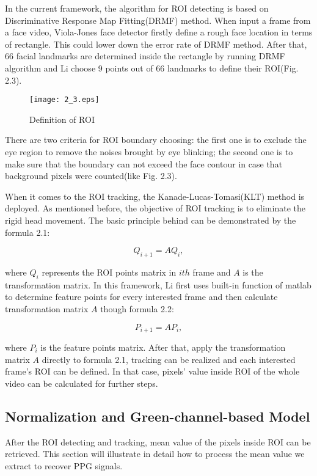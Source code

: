 In the current framework, the algorithm for ROI detecting is based on Discriminative Response Map Fitting(DRMF) method. When input a frame from a face video, Viola-Jones face detector firstly define a rough face location in terms of rectangle. This could lower down the error rate of DRMF method. After that, 66 facial landmarks are determined inside the rectangle by running DRMF algorithm and Li choose 9 points out of 66 landmarks to define their ROI(Fig. 2.3). 

\begin{figure}[ht]
\centering
\texttt{[image: 2\_3.eps]}
\caption{Definition of ROI}\label{fig:noted-figure}
\end{figure}

There are two criteria for ROI boundary choosing: the first one is to exclude the eye region to remove the noises brought by eye blinking; the second one is to make sure that the boundary can not exceed the face contour in case that background pixels were counted(like Fig. 2.3).

When it comes to the ROI tracking, the Kanade-Lucas-Tomasi(KLT) method is deployed. As mentioned before, the objective of ROI tracking is to eliminate the rigid head movement. The basic principle behind can be demonstrated by the formula 2.1:


    \begin{equation}
        Q_{i+1} = AQ_i,
    \end{equation}

 where \textbf{$Q_i$} represents the ROI points matrix in $ith$ frame and $A$ is the transformation matrix. In this framework, Li first uses built-in function of matlab to determine feature points for every interested frame and then calculate transformation matrix $A$ though formula 2.2:

     \begin{equation}
        P_{i+1} = AP_i,
    \end{equation}

 where \textbf{$P_i$} is the feature points matrix. After that, apply the transformation matrix $A$ directly to formula 2.1, tracking can be realized and each interested frame's ROI can be defined. In that case, pixels' value inside ROI of the whole video can be calculated for further steps.

\subsection{Normalization and Green-channel-based Model}
After the ROI detecting and tracking, mean value of the pixels inside ROI can be retrieved. This section will illustrate in detail how to process the mean value we extract to recover PPG signals.

